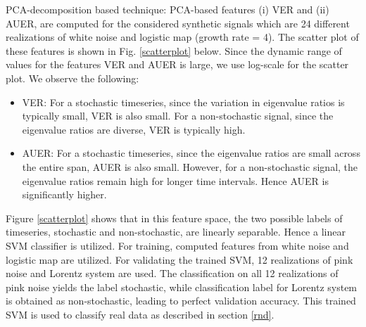 \documentclass[journal]{IEEEtran}
\begin{document}
	
		PCA-decomposition based technique: PCA-based features (i) VER and (ii) AUER,  are computed for the considered synthetic signals which are 24 different realizations of white noise and logistic map (growth rate = 4). The scatter plot of these features is shown in Fig. \ref{scatterplot} below. Since the dynamic range of values for the features VER and AUER is large, we use log-scale for the scatter plot. We observe the following:
	\begin{itemize}
		\item VER: For a stochastic timeseries, since the variation in eigenvalue ratios is typically small, VER is also small. For a non-stochastic signal, since the eigenvalue ratios are diverse, VER is typically high.
		\item AUER: For a stochastic timeseries, since the eigenvalue ratios  are small across the entire span, AUER is also small. However, for a non-stochastic signal, the eigenvalue ratios remain high for longer time intervals. Hence AUER is significantly higher.
	\end{itemize}


	 Figure \ref{scatterplot} shows that in this feature space, the two possible labels of timeseries, stochastic and non-stochastic, are linearly separable. Hence a linear SVM classifier is utilized. For training, computed features from white noise and logistic map are utilized. For validating the trained SVM, 12 realizations of pink noise and Lorentz system are used. The classification on all 12 realizations of pink noise yields the label stochastic, while classification label for Lorentz system is obtained as non-stochastic, leading to perfect validation accuracy. This trained SVM is used to classify real data as described in section \ref{rnd}.
	
\end{document}
